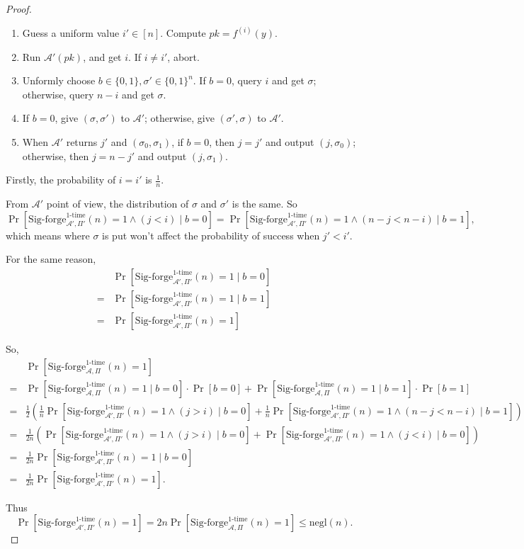 \documentclass[a4paper]{article}
\newcommand{\negl}{\text{negl}}
\newcommand{\otime}{\text{1-time}}
\newcommand{\A}{\mathcal{A}}
\newenvironment{problem}[2][Problem]{\begin{trivlist}
\item[\hskip \labelsep {\bfseries #1}\hskip \labelsep {\bfseries #2.}]}{\end{trivlist}}
\begin{document}
\begin{problem}{12.8}
\begin{proof}
\begin{enumerate}
    \item Guess a uniform value $i'\in[n]$. Compute $pk=f^{(i)}(y)$.
    \item Run $\A'(pk)$, and get $i$. If $i\ne i'$, abort.
    \item Unformly choose $b\in\{0,1\},\sigma'\in\{0,1\}^n$.
    If $b=0$, query $i$ and get $\sigma$; otherwise, query $n-i$ and get $\sigma$.
    \item If $b=0$, give $(\sigma,\sigma')$ to $\A'$; otherwise, give $(\sigma',\sigma)$ to $\A'$.
    \item When $\A'$ returns $j'$ and $(\sigma_0,\sigma_1)$, if $b=0$, then $j=j'$ and output $(j,\sigma_0)$; otherwise, then $j=n-j'$ and output $(j,\sigma_1)$.
\end{enumerate}\par
Firstly, the probability of $i=i'$ is $\frac1n$.\par
From $\A'$ point of view, the distribution of $\sigma$ and $\sigma'$ is the same. So
$$\Pr[\text{Sig-forge}_{\A',\Pi'}^{\otime}(n)=1\land (j<i)\mid b=0]=\Pr[\text{Sig-forge}_{\A',\Pi'}^{\otime}(n)=1\land (n-j<n-i)\mid b=1],$$ which means where $\sigma$ is put won't affect the probability of success when $j'<i'$.\par
For the same reason,
\begin{align*}
    &\Pr[\text{Sig-forge}_{\A',\Pi'}^{\otime}(n)=1\mid b=0]\\
    =&\Pr[\text{Sig-forge}_{\A',\Pi'}^{\otime}(n)=1\mid b=1]\\
    =&\Pr[\text{Sig-forge}_{\A',\Pi'}^{\otime}(n)=1]
\end{align*}\par
So,
\begin{align*}
    &\Pr[\text{Sig-forge}_{\A,\Pi}^{\otime}(n)=1]\\
    =&\Pr[\text{Sig-forge}_{\A,\Pi}^{\otime}(n)=1\mid b=0]\cdot\Pr[b=0]+\Pr[\text{Sig-forge}_{\A,\Pi}^{\otime}(n)=1\mid b=1]\cdot\Pr[b=1]\\
    =&\frac{1}{2}(\frac1n\Pr[\text{Sig-forge}_{\A',\Pi'}^{\otime}(n)=1\land (j>i)\mid b=0]+\frac1n\Pr[\text{Sig-forge}_{\A',\Pi'}^{\otime}(n)=1\land (n-j<n-i)\mid b=1])\\
    =&\frac{1}{2n}(\Pr[\text{Sig-forge}_{\A',\Pi'}^{\otime}(n)=1\land (j>i)\mid b=0]+\Pr[\text{Sig-forge}_{\A',\Pi'}^{\otime}(n)=1\land (j<i)\mid b=0])\\
    =&\frac{1}{2n}\Pr[\text{Sig-forge}_{\A',\Pi'}^{\otime}(n)=1\mid b=0]\\
    =&\frac{1}{2n}\Pr[\text{Sig-forge}_{\A',\Pi'}^{\otime}(n)=1].
\end{align*}\par
Thus $$\Pr[\text{Sig-forge}_{\A',\Pi'}^{\otime}(n)=1]=2n\Pr[\text{Sig-forge}_{\A,\Pi}^{\otime}(n)=1]\le\negl(n).$$
\end{proof}
\end{problem}
\end{document}

